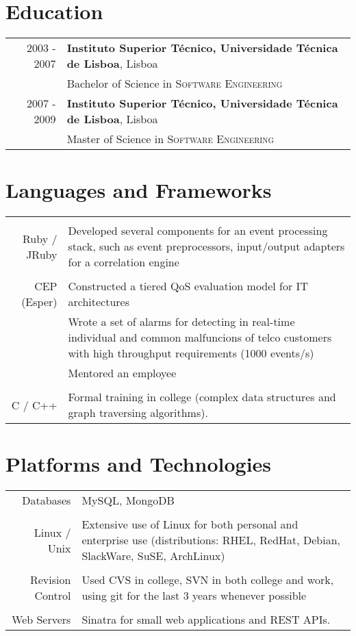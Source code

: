 \documentclass[a4paper,10pt]{article}
\begin{document}
\section{Education}
\begin{tabular}{rl}	
2003 - 2007 & \textbf{Instituto Superior Técnico, Universidade Técnica de Lisboa}, Lisboa\\
 & Bachelor of Science in \textsc{Software Engineering} \\
2007 - 2009 & \textbf{Instituto Superior Técnico, Universidade Técnica de Lisboa}, Lisboa\\
 & Master of Science in \textsc{Software Engineering}
\end{tabular}

\section{Languages and Frameworks}
\begin{tabular}{r|p{11cm}}
\multicolumn{2}{c}{} \\
Ruby / JRuby & Developed several components for an event processing stack, such
as event preprocessors, input/output adapters for a correlation engine \\
\multicolumn{2}{c}{} \\
CEP (Esper) & Constructed a tiered QoS evaluation model for IT architectures \\
 & Wrote a set of alarms for detecting in real-time individual and common malfuncions of
 telco customers with high throughput requirements (1000 events/s)\\
 & Mentored an employee \\
\multicolumn{2}{c}{} \\
C / C++ &  Formal training in college (complex data structures and graph traversing algorithms).\\
\end{tabular}

\section{Platforms and Technologies}
\begin{tabular}{r|p{11cm}}
Databases & MySQL, MongoDB\\
\multicolumn{2}{c}{} \\
Linux / Unix &  Extensive use of Linux for both personal and enterprise use (distributions: RHEL, RedHat, Debian, SlackWare, SuSE, ArchLinux) \\
\multicolumn{2}{c}{} \\
Revision Control & Used CVS in college, SVN in both college and work, using git for the last 3 years whenever possible\\
\multicolumn{2}{c}{} \\
Web Servers & Sinatra for small web applications and REST APIs.\\
\end{tabular}
\end{document}
